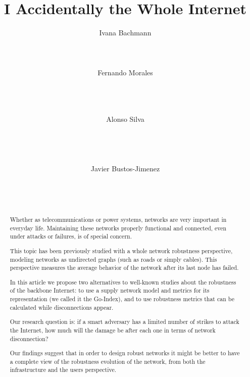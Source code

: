\documentclass{sig-alternate-10pt}
\begin{document}
\title{I Accidentally the Whole Internet}
\author{
\alignauthor
Ivana Bachmann\\
\\
\\
\\
\alignauthor
Fernando Morales\\
\\
\\
\\
\and
Alonso Silva\\
\\
\\
\\
\\
\alignauthor
Javier Bustos-Jimenez\\
\\
\\
\\
}
\additionalauthors{}

\maketitle
\begin{abstract}
Whether as telecommunications or power systems, networks are very important in everyday life. 
Maintaining these networks properly functional and connected, even under attacks or failures, is of special concern.

This topic has been previously studied with a whole network robustness perspective,
modeling networks as undirected graphs (such as roads or simply cables).
This perspective measures the average behavior of the network after its last node has failed.

In this article we propose two alternatives to well-known studies about the robustness of the backbone Internet:
to use a supply network model and metrics for its representation (we called it the Go-Index),
and to use robustness metrics that can be calculated while disconnections appear.

Our research question is: 
if a smart adversary has a limited number of strikes to attack the Internet,
how much will the damage be after each one in terms of network disconnection?  

Our findings suggest that in order to design robust networks
it might be better to have a complete view of the robustness evolution of the network,
from both the infrastructure and the users perspective.

\end{abstract}
\end{document}
